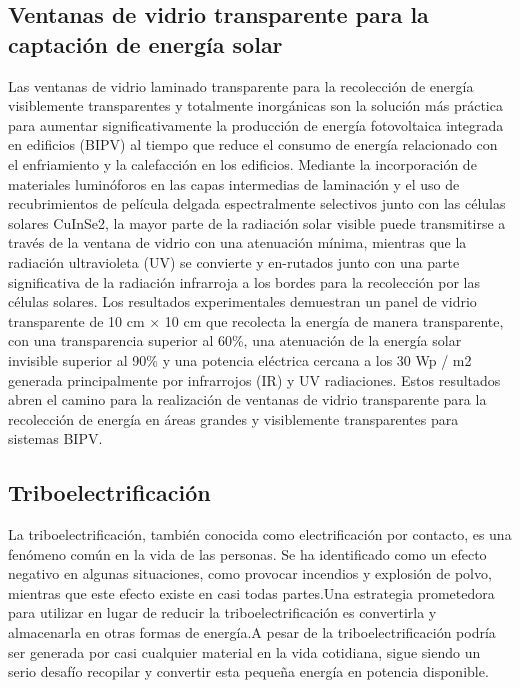\documentclass[journal, a4paper]{IEEEtran}
\begin{document}
\subsection{Ventanas de vidrio transparente para la captación de energía solar}
Las ventanas de vidrio laminado transparente\citep{Alghamedi2014} para la  recolección de energía visiblemente transparentes y totalmente inorgánicas son la solución más práctica para aumentar significativamente la producción de energía fotovoltaica integrada en edificios (BIPV) al tiempo que reduce el consumo de energía relacionado con el enfriamiento y la calefacción en los edificios. Mediante la incorporación de materiales luminóforos en las capas intermedias de laminación y el uso de recubrimientos de película delgada espectralmente selectivos junto con las células solares CuInSe2, la mayor parte de la radiación solar visible puede transmitirse a través de la ventana de vidrio con una atenuación mínima, mientras que la radiación ultravioleta (UV) se convierte y en-rutados junto con una parte significativa de la radiación infrarroja a los bordes para la recolección por las células solares. Los resultados experimentales demuestran un panel de vidrio transparente de 10 cm × 10 cm que recolecta la energía de manera transparente, con una transparencia superior al 60\%, una atenuación de la energía solar invisible superior al 90\% y una potencia eléctrica cercana a los 30 Wp / m2 generada principalmente por infrarrojos (IR) y UV radiaciones. Estos resultados abren el camino para la realización de ventanas de vidrio transparente para la recolección de energía en áreas grandes y visiblemente transparentes para sistemas BIPV.

\subsection{Triboelectrificación}
La triboelectrificación\citep{Chen2018}, también conocida como electrificación por contacto, es una fenómeno común en la vida de las personas. Se ha identificado como un efecto negativo en algunas situaciones, como provocar incendios y explosión de polvo, mientras que este efecto existe en casi todas partes.Una estrategia prometedora para utilizar en lugar de reducir la triboelectrificación es convertirla y almacenarla en otras formas de energía.A pesar de la triboelectrificación\citep{Chen2018} podría ser generada por casi cualquier
material en la vida cotidiana, sigue siendo un serio desafío recopilar y convertir esta pequeña energía en potencia disponible. 
\end{document}
